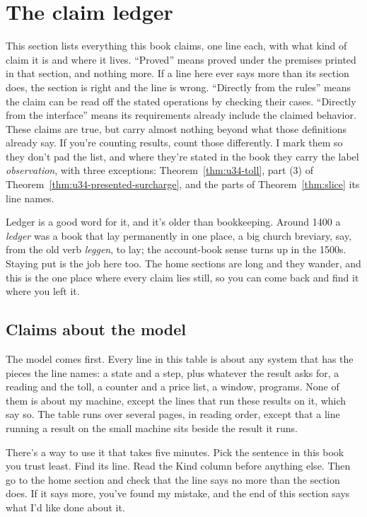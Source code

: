 \documentclass[11pt,twoside]{article}
\theoremstyle{thielethm}
\theoremstyle{thieledef}
\theoremstyle{thieledef}
\theoremstyle{thieledef}
\theoremstyle{thielethm}
\theoremstyle{thieleobs}
\theoremstyle{thielethm}
\begin{document}
\section{The claim ledger}

This section lists everything this book claims, one line each, with what kind of claim it is and
where it lives. ``Proved'' means proved under the premises printed in that section, and nothing more.
If a line here ever says more than its section does, the section is right and the line is
wrong. ``Directly from the rules'' means the claim can be read off the stated
operations by checking their cases. ``Directly from the interface'' means its
requirements already include the claimed behavior. These claims are true, but
carry almost nothing beyond what those definitions already say. If you're counting results, count those
differently. I mark them so they don't pad the list, and where they're stated in the book they
carry the label \emph{observation}, with three exceptions: Theorem~\ref{thm:u34-toll}, part (3)
of Theorem~\ref{thm:u34-presented-surcharge}, and the parts of Theorem~\ref{thm:slice} its line names.

Ledger is a good word for it, and it's older than bookkeeping. Around 1400 a \emph{ledger} was a
book that lay permanently in one place, a big church breviary, say, from the old verb
\emph{leggen}, to lay; the account-book sense turns up in the 1500s. Staying put is
the job here too. The home sections are long and they wander, and this is the one place where
every claim lies still, so you can come back and find it where you left it.

\subsection{Claims about the model}

The model comes first. Every line in this table is about any system that has the pieces the line
names: a state and a step, plus whatever the result asks for, a reading and the toll, a
counter and a price list, a window, programs. None of them is about my machine, except the lines that run these results on it,
which say so. The table
runs over several pages, in reading order, except that a line running a result on the small
machine sits beside the result it runs.

There's a way to use it that takes five minutes. Pick the sentence in this book you trust
least. Find its line. Read the Kind column before anything else. Then go to the home section
and check that the line says no more than the section does. If it says more, you've found my
mistake, and the end of this section says what I'd like done about it.
\end{document}
